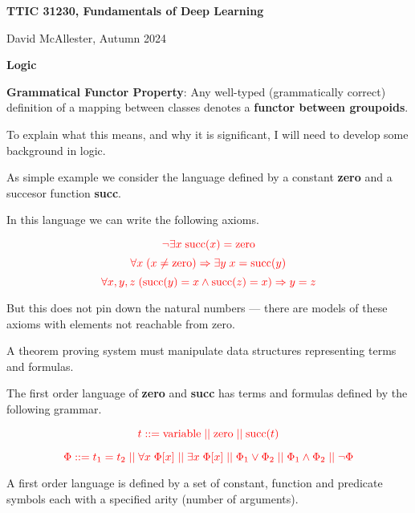




{\Huge

  \centerline{\bf TTIC 31230, Fundamentals of Deep Learning}

  
\bigskip

\centerline{David McAllester, Autumn  2024}


\vfill

\centerline{\bf Logic}


{\bf Grammatical Functor Property}: Any well-typed (grammatically correct) definition of a mapping between classes denotes a {\bf functor between groupoids}.

\vfill
To explain what this means, and why it is significant, I will need to develop some background in logic.


As simple example we consider the language defined by a constant {\bf zero} and a succesor function {\bf succ}.

\vfill
In this language we can write the following axioms.

$${\color{red} \neg \exists x \;\mathrm{succ}(x) = \mathrm{zero}}$$
$${\color{red} \forall x\; (x \neq \mathrm{zero}) \Rightarrow \exists y\; x = \mathrm{succ}(y)}$$
$${\color{red}\forall x,y,z \;(\mathrm{succ}(y)= x \wedge \mathrm{succ}(z)= x) \Rightarrow y=z}$$

\vfill
But this does not pin down the natural numbers --- there are models of these axioms with
elements not reachable from zero.


A theorem proving system must manipulate data structures representing terms and formulas.

\vfill
The first order language  of {\bf zero} and {\bf succ} has terms and formulas
defined by the following grammar.

$${\color{red} t
::= \mathrm{variable} \;||\; \mathrm{zero} \;||\; \mathrm{succ}(t)}$$

$${\color{red} \Phi ::= t_1=t_2 \;||\; \forall x\; \Phi[x] \;||\; \exists x\; \Phi[x] \;||\; \Phi_1 \vee \Phi_2 \;||\; \Phi_1 \wedge \Phi_2 \;||\; \neg \Phi}$$



A first order language is defined by a set of constant, function and predicate symbols each with a specified
arity (number of arguments).

}
